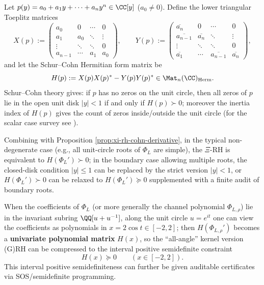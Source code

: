 \begin{remark}\label{rem:xi-schur-cohn-sdp-interface}
Let \(p(y)=a_0+a_1y+\cdots+a_n y^n\in\CC[y]\) (\(a_0\neq 0\)).
Define the lower triangular Toeplitz matrices
\[
X(p):=\begin{pmatrix}
a_0 & 0 & \cdots & 0\\
a_1 & a_0 & \ddots & \vdots\\
\vdots & \ddots & \ddots & 0\\
a_{n-1} & \cdots & a_1 & a_0
\end{pmatrix},
\qquad
Y(p):=\begin{pmatrix}
\overline{a_n} & 0 & \cdots & 0\\
\overline{a_{n-1}} & \overline{a_n} & \ddots & \vdots\\
\vdots & \ddots & \ddots & 0\\
\overline{a_1} & \cdots & \overline{a_{n-1}} & \overline{a_n}
\end{pmatrix},
\]
and let the Schur--Cohn Hermitian form matrix be
\[
H(p):=X(p)X(p)^\ast-Y(p)Y(p)^\ast\in\Mat_n(\CC)_{\mathrm{Herm}}.
\]
Schur--Cohn theory gives: if \(p\) has no zeros on the unit circle, then all zeros of \(p\) lie in the open unit disk \(|y|<1\) if and only if \(H(p)\succ 0\); moreover the inertia index of \(H(p)\) gives the count of zeros inside/outside the unit circle (for the scalar case survey see \cite{DymYoung1990SchurCohnMatrixPolynomials}).
\par
Combining with Proposition \ref{prop:xi-rh-cohn-derivative}, in the typical non-degenerate case (e.g., all unit-circle roots of \(\Phi_L\) are simple), the \(\Xi\)-RH is equivalent to \(H(\Phi_L')\succ 0\);
in the boundary case allowing multiple roots, the closed-disk condition \(|y|\le 1\) can be replaced by the strict version \(|y|<1\), or \(H(\Phi_L')\succ 0\) can be relaxed to \(H(\Phi_L')\succeq 0\) supplemented with a finite audit of boundary roots.
\par
When the coefficients of \(\Phi_L\) (or more generally the channel polynomial \(\Phi_{L,\rho}\)) lie in the invariant subring \(\QQ[u+u^{-1}]\), along the unit circle \(u=e^{it}\) one can view the coefficients as polynomials in \(x=2\cos t\in[-2,2]\); then \(H(\Phi_{L,\rho}')\) becomes a \textbf{univariate polynomial matrix} \(H(x)\), so the ``all-angle'' kernel version (G)RH can be compressed to the interval positive semidefinite constraint
\[
H(x)\succeq 0\qquad(x\in[-2,2]).
\]
This interval positive semidefiniteness can further be given auditable certificates via SOS/semidefinite programming.
\end{remark}

